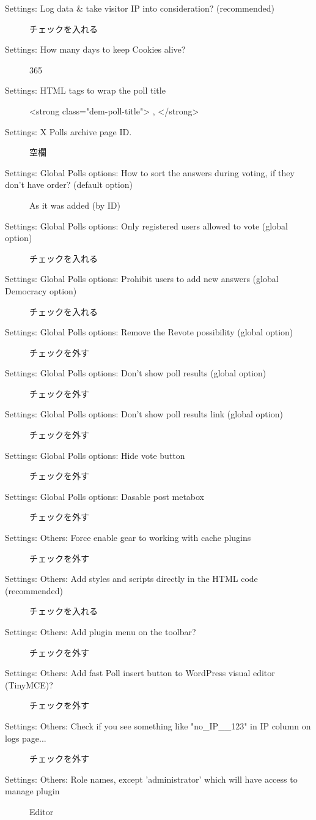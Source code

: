 \documentclass[titlepage,10pt,a4paper,uplatex]{jsbook}
\begin{document}
\begin{description}
\item[Settings: Log data \& take visitor IP into consideration? (recommended)] チェックを入れる
\item[Settings: How many days to keep Cookies alive?] 365
\item[Settings: HTML tags to wrap the poll title] {\textless}strong class="dem-poll-title"{\textgreater} , {\textless}/strong{\textgreater}
\item[Settings: X Polls archive page ID.] 空欄
\item[Settings: Global Polls options: How to sort the answers during voting, if they don't have order? (default option)] As it was added (by ID)
\item[Settings: Global Polls options: Only registered users allowed to vote (global option)] チェックを入れる
\item[Settings: Global Polls options: Prohibit users to add new answers (global Democracy option)] チェックを入れる
\item[Settings: Global Polls options: Remove the Revote possibility (global option)] チェックを外す
\item[Settings: Global Polls options: Don't show poll results (global option)] チェックを外す
\item[Settings: Global Polls options: Don't show poll results link (global option)] チェックを外す
\item[Settings: Global Polls options: Hide vote button] チェックを外す
\item[Settings: Global Polls options: Dasable post metabox] チェックを外す
\item[Settings: Others: Force enable gear to working with cache plugins] チェックを外す
\item[Settings: Others: Add styles and scripts directly in the HTML code (recommended)] チェックを入れる
\item[Settings: Others: Add plugin menu on the toolbar?] チェックを外す
\item[Settings: Others: Add fast Poll insert button to WordPress visual editor (TinyMCE)?] チェックを外す
\item[Settings: Others: Check if you see something like "no\_IP\_\_123" in IP column on logs page...] チェックを外す
\item[Settings: Others: Role names, except 'administrator' which will have access to manage plugin] Editor
\end{description}
\end{document}

